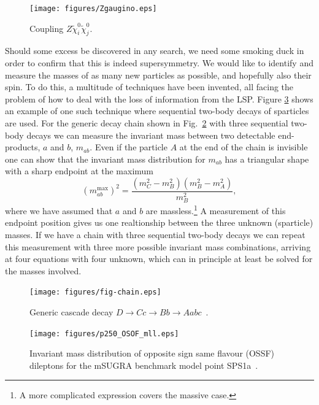 \documentclass[notes.tex]{subfiles}
\begin{document}
\begin{figure}[h!]
\begin{center}
\texttt{[image: figures/Zgaugino.eps]} 
\caption{Coupling $Z\tilde\chi_i^0\tilde\chi_j^0$.\label{fig:ZNN}}
\end{center}
\end{figure}

Should some excess be discovered in any search, we need some smoking duck in order to confirm that this is indeed supersymmetry.  We would like to identify and measure the masses of as many new particles as possible, and hopefully also their spin. To do this, a multitude of techniques have been invented, all facing the problem of how to deal with the loss of information from the LSP. Figure \ref{measurement} shows an example of one such technique where sequential two-body decays of sparticles are used. For the generic decay chain shown in Fig.~\ref{fig:gen_casc} with three sequential two-body decays we can measure the invariant mass between two detectable end-products, $a$ and $b$, $m_{ab}$. Even if the particle $A$ at the end of the chain is invisible one can show that the invariant mass distribution for $m_{ab}$ has a triangular shape with a sharp endpoint at the maximum
\begin{equation}
(m_{ab}^{\max})^{2} = \frac{\left(m_{C}^{2}-m_{B}^{2}\right)
\left(m_{B}^{2}-m_{A}^{2}\right)}{m_{B}^{2}}, 
\label{eq:m_ab}
\end{equation}
where we have assumed that $a$ and $b$ are massless.\footnote{A more complicated expression covers the massive case.} A measurement of this endpoint position gives us one realtionship between the three unknown (sparticle) masses. If we have a chain with three sequential two-body decays we can repeat this measurement with three more possible invariant mass combinations, arriving at four equations with four unknown, which can in principle at least be solved for the masses involved.

\begin{figure}[h!]
\centering
\texttt{[image: figures/fig-chain.eps]} 
\caption{Generic cascade decay $D\to Cc\to  Bb \to Aabc$~\cite{Miller:2005zp}. \label{fig:gen_casc}}
\end{figure}

\begin{figure}[h!]
\centering
\texttt{[image: figures/p250\_OSOF\_mll.eps]} 
\caption{Invariant mass distribution of opposite sign same flavour (OSSF) dileptons for the mSUGRA benchmark model point SPS1a~\cite{Gjelsten:2004ki}. \label{measurement}}
\end{figure}
\end{document}
